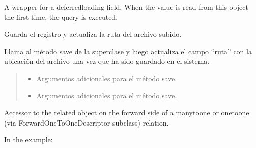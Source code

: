 \documentclass[letterpaper,10pt,spanish]{sphinxmanual}
\begin{document}
\begin{fulllineitems}
\begin{fulllineitems}

\pysigstartsignatures
{}
\pysigstopsignatures
\sphinxAtStartPar
A wrapper for a deferred\sphinxhyphen{}loading field. When the value is read from this
object the first time, the query is executed.

\end{fulllineitems}



\begin{fulllineitems}

\pysigstartsignatures
{}
\pysigstopsignatures
\sphinxAtStartPar
Guarda el registro y actualiza la ruta del archivo subido.

\sphinxAtStartPar
Llama al método save de la superclase y luego actualiza el campo “ruta”
con la ubicación del archivo una vez que ha sido guardado en el sistema.
\begin{quote}\begin{description}
\begin{itemize}
\item {} 
\sphinxAtStartPar
{} \textendash{} Argumentos adicionales para el método save.

\item {} 
\sphinxAtStartPar
{} \textendash{} Argumentos adicionales para el método save.

\end{itemize}

\end{description}\end{quote}

\end{fulllineitems}



\begin{fulllineitems}

\pysigstartsignatures
{}
\pysigstopsignatures
\sphinxAtStartPar
Accessor to the related object on the forward side of a many\sphinxhyphen{}to\sphinxhyphen{}one or
one\sphinxhyphen{}to\sphinxhyphen{}one (via ForwardOneToOneDescriptor subclass) relation.

\sphinxAtStartPar
In the example:


\end{fulllineitems}
\end{fulllineitems}
\end{document}
